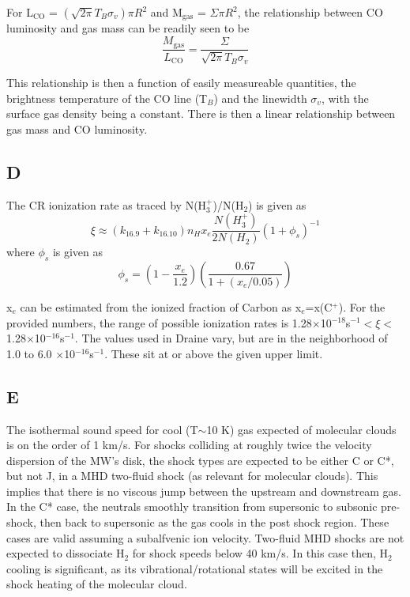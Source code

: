 \documentclass[a4paper]{article}
\begin{document}
For L$_{\text{CO}}$ = $\left(\sqrt{2\pi}T_{B}\sigma_v\right)\pi R^2$ and 
M$_{\text{gas}}$ = $\Sigma \pi R^2$, the relationship between CO luminosity and 
gas mass can be readily seen to be
\begin{equation}
\frac{M_{\text{gas}}}{L_{\text{CO}}} = \frac{\Sigma}{\sqrt{2\pi}T_{B}\sigma_{v}}
\end{equation}

This relationship is then a function of easily measureable quantities,
the brightness temperature of the CO line (T$_{B}$) and the linewidth $\sigma_v$,
with the surface gas density being a constant. There is then a linear 
relationship between gas mass and CO luminosity.

\subsection{D}
The CR ionization rate as traced by N(H$_3^+$)/N(H$_2$) is given as
\begin{equation}
\xi \approx (k_{16.9} + k_{16.10})n_{H}x_e\frac{N(H_3^+)}{2N(H_2)}(1+\phi_s)^{-1}
\end{equation}
where $\phi_s$ is given as
\begin{equation}
\phi_s = \left(1-\frac{x_e}{1.2}\right)\left(\frac{0.67}{1+\left(x_e/0.05\right)}\right)
\end{equation}

x$_{e}$ can be estimated from the ionized fraction of Carbon as x$_{e}$=x(C$^+$).
For the provided numbers, the range of possible ionization rates is
1.28$\times$10$^{-18}$s$^{-1} < \xi <$ 1.28$\times$10$^{-16}$s$^{-1}$. The values
used in Draine vary, but are in the neighborhood of 1.0 to 6.0 $\times$10$^{-16}$s$^{-1}$.
These sit at or above the given upper limit. 

\subsection{E}
The isothermal sound speed for cool (T$\sim$10 K) gas expected of molecular
clouds is on the order of 1 km/s. For shocks colliding at roughly twice the 
velocity dispersion of the MW's disk, the shock types are expected to be
either C or C*, but not J, in a MHD two-fluid shock (as relevant for molecular
clouds). This implies that there is no viscous jump between the upstream and 
downstream gas. In the C* case, the neutrals smoothly transition from supersonic
to subsonic pre-shock, then back to supersonic as the gas cools in the post
shock region. These cases are valid assuming a subalfvenic ion velocity. Two-fluid
MHD shocks are not expected to dissociate H$_2$ for shock speeds below 40 km/s. 
In this case then, H$_2$ cooling is significant, as its vibrational/rotational
states will be excited in the shock heating of the molecular cloud.
\end{document}
